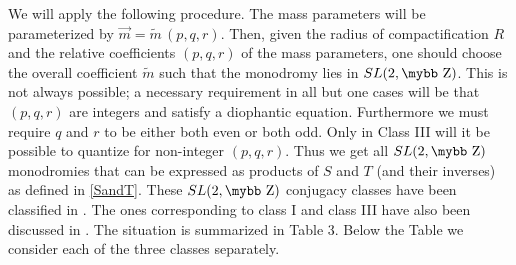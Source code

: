 \documentclass[12pt,a4paper]{article}
\def\bb#1{\hbox{\mybb#1}}
\begin{document}
We will apply the following procedure. The mass parameters will be
parameterized by $\vec{m}=\tilde m \, (p,q,r)$. Then, given the radius of
compactification $R$ and the relative coefficients $(p,q,r)$ of the mass
parameters, one should choose the overall coefficient $\tilde m$
such that the monodromy lies in $SL(2,\bb{Z})$. This is not always possible;
a necessary requirement in all but one cases will be that $(p,q,r)$ are
integers and satisfy a diophantic equation. Furthermore we must
require $q$ and $r$ to be either both even or both odd. Only in Class III
will it be possible to quantize for non-integer $(p,q,r)$. Thus we get all
$SL(2,\bb{Z})$ monodromies that can be expressed as products of $S$ and $T$
(and their inverses) as defined in \eqref{SandT}.
These $SL(2,\bb{Z})$ conjugacy classes have been classified
in \cite{DeWolfe:1998eu, DeWolfe:1998pr}. The ones corresponding
to class I and class III have also been discussed in \cite{Hull:2002wg}.
The situation is summarized in Table 3.
Below the Table we consider each of the three classes separately.
\end{document}
